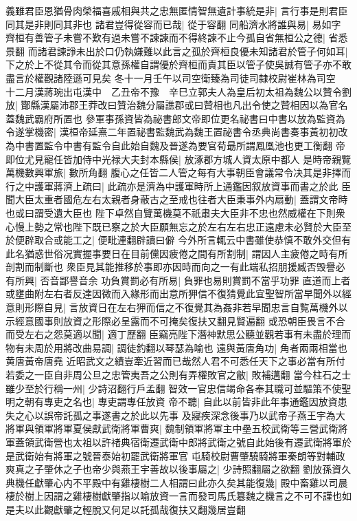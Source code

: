 義雖君臣恩猶骨肉榮福喜戚相與共之忠無匿情智無遺計事統是非|{
	言行事是則君臣同其是非則同其非也}
諸君豈得從容而已哉|{
	從于容翻}
同船濟水將誰與易|{
	易如字}
齊桓有善管子未嘗不歎有過未嘗不諫諫而不得終諫不止今孤自省無桓公之德|{
	省悉景翻}
而諸君諫諍未出於口仍執嫌難以此言之孤於齊桓良優未知諸君於管子何如耳|{
	下之於上不從其令而從其意孫權自謂優於齊桓而責其臣以管子使吳誠有管子亦不敢盡言於權觀諸陸遜可見矣}
冬十一月壬午以司空衛臻為司徒司隸校尉崔林為司空　十二月漢蔣琬出屯漢中　乙丑帝不豫　辛巳立郭夫人為皇后初太祖為魏公以贊令劉放|{
	酇縣漢屬沛郡王莽改曰贊治魏分屬譙郡或曰贊相也凡出令使之贊相因以為官名蓋魏武霸府所置也}
參軍事孫資皆為祕書郎文帝即位更名祕書曰中書以放為監資為令遂掌機密|{
	漢桓帝延熹二年置祕書監魏武為魏王置祕書令丞典尚書奏事黃初初改為中書置監令中書有監令自此始自魏及晉遂為要官荀朂所謂鳳凰池也更工衡翻}
帝即位尤見寵任皆加侍中光禄大夫封本縣侯|{
	放涿郡方城人資太原中都人}
是時帝親覽萬機數興軍旅|{
	數所角翻}
腹心之任皆二人管之每有大事朝臣會議常令决其是非擇而行之中護軍蔣濟上疏曰|{
	此疏亦是濟為中護軍時所上通鑑因叙放資事而書之於此}
臣聞大臣太重者國危左右太親者身蔽古之至戒也往者大臣秉事外内扇動|{
	蓋謂文帝時也或曰謂受遺大臣也}
陛下卓然自覽萬機莫不祇肅夫大臣非不忠也然威權在下則衆心慢上勢之常也陛下既已察之於大臣願無忘之於左右左右忠正遠慮未必賢於大臣至於便辟取合或能工之|{
	便毗連翻辟讀曰僻}
今外所言輒云中書雖使恭慎不敢外交但有此名猶惑世俗况實握事要日在目前儻因疲倦之間有所割制|{
	謂因人主疲倦之時有所剖割而制斷也}
衆臣見其能推移於事即亦因時而向之一有此端私招朋援臧否毁譽必有所興|{
	否音鄙譽音余}
功負賞罰必有所易|{
	負罪也易則賞罰不當乎功罪}
直道而上者或壅曲附左右者反達因微而入緣形而出意所狎信不復猜覺此宜聖智所當早聞外以經意則形際自見|{
	言放資日在左右狎而信之不復覺其為姦非若早聞忠言自覧萬機外以示經意國事則放資之形際必呈露而不可掩矣復扶又翻見賢遍翻}
或恐朝臣畏言不合而受左右之怨莫適以聞|{
	適丁歷翻}
臣竊亮陛下潛神默思公聽並觀若事有未盡於理而物有未周於用將改曲易調|{
	調徒釣翻以琴瑟為喻也}
遠與黃唐角功|{
	角者兩兩相當也黄唐黃帝唐堯}
近昭武文之績豈牽近習而已哉然人君不可悉任天下之事必當有所付若委之一臣自非周公旦之忠管夷吾之公則有弄權敗官之敝|{
	敗補邁翻}
當今柱石之士雖少至於行稱一州|{
	少詩沼翻行戶孟翻}
智效一官忠信竭命各奉其職可並驅策不使聖明之朝有專吏之名也|{
	專吏謂專任放資}
帝不聽|{
	自此以前皆非此年事通鑑因放資患失之心以誤帝託孤之事遂書之於此以先事}
及寢疾深念後事乃以武帝子燕王宇為大將軍與領軍將軍夏侯獻武衛將軍曹爽|{
	魏制領軍將軍主中壘五校武衛等三營武衛將軍蓋領武衛營也太祖以許禇典宿衛遷武衛中郎將武衛之號自此始後有遷武衛將軍於是武衛始有將軍之號晉泰始初罷武衛將軍官}
屯騎校尉曹肇驍騎將軍秦朗等對輔政爽真之子肇休之子也帝少與燕王宇善故以後事屬之|{
	少詩照翻屬之欲翻}
劉放孫資久典機任獻肇心内不平殿中有雞棲樹二人相謂曰此亦久矣其能復幾|{
	殿中畜雞以司晨棲於樹上因謂之雞棲樹獻肇指以喻放資一言而發司馬氏簒魏之機言之不可不謹也如是夫以此觀獻肇之輕脫又何足以託孤哉復扶又翻幾居豈翻}
